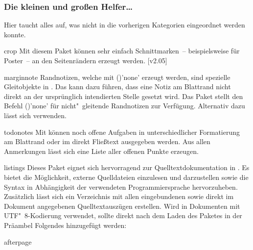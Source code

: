 \subsubsection{Die kleinen und großen Helfer\dots}
Hier taucht alles auf, was nicht in die vorherigen Kategorien eingeordnet 
werden konnte.
%
\begin{packages}
\item[crop]
  Mit diesem Paket können sehr einfach Schnittmarken~-- beispielsweise für 
  Poster~-- an den Seitenrändern erzeugt werden.
  [v2.05]
\item[marginnote]
  Randnotizen, welche mit ()'none' erzeugt
  werden, sind spezielle Gleitobjekte in . Das kann dazu führen, 
  dass eine Notiz am Blattrand nicht direkt an der ursprünglich intendierten 
  Stelle gesetzt wird. Das Paket  stellt den Befehl 
  ()'none' für nicht"~gleitende 
  Randnotizen zur Verfügung. Alternativ dazu lässt sich  
  verwenden.
\item[todonotes]
  Mit  können noch offene Aufgaben in unterschiedlicher 
  Formatierung am Blattrand oder im direkt Fließtext ausgegeben werden. Aus 
  allen Anmerkungen lässt sich eine Liste aller offenen Punkte erzeugen.
\item[listings]
  Dieses Paket eignet sich hervorragend zur Quelltextdokumentation in 
  . Es bietet die Möglichkeit, externe Quelldateien einzulesen 
  und darzustellen sowie die Syntax in Abhängigkeit der verwendeten 
  Programmiersprache hervorzuheben. Zusätzlich lässt sich ein Verzeichnis mit 
  allen eingebundenen sowie direkt im Dokument angegebenen Quelltextauszügen 
  erstellen.
  Wird  in Dokumenten mit UTF"~8-Kodierung verwendet, sollte 
  direkt nach dem Laden des Paketes in der Präambel Folgendes hinzugefügt 
  werden:
  \begin{Code}
  \end{Code}\vspace{-\baselineskip}%
\item[afterpage]

\end{packages}
